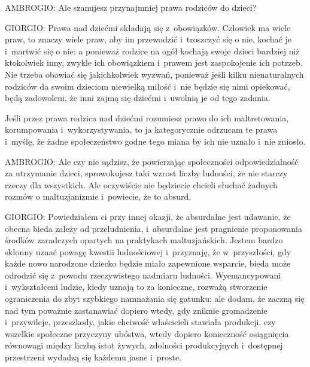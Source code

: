 \documentclass[oneside,polish,11pt,sfheadings]{mwbk}
\begin{document}
 
\noindent AMBROGIO: Ale szanujesz przynajmniej prawa rodziców do dzieci? 




 
\noindent GIORGIO: Prawa nad dziećmi składają się z~obowiązków. Człowiek ma wiele praw, to znaczy wiele praw, aby im przewodzić i~troszczyć się o nie, kochać je i~martwić się o nie: a ponieważ rodzice na ogół kochają swoje dzieci bardziej niż
ktokolwiek inny, zwykle ich obowiązkiem i~prawem jest zaspokojenie ich potrzeb. Nie trzeba obawiać się jakichkolwiek
wyzwań, ponieważ jeśli kilku nienaturalnych rodziców da swoim dzieciom niewielką miłość i~nie będzie się nimi
opiekować, będą zadowoleni, że inni zajmą się dziećmi i~uwolnią je od tego zadania. 

 
Jeśli przez prawa rodzica nad dziećmi rozumiesz prawo do ich maltretowania, korumpowania i~wykorzystywania, to ja
kategorycznie odrzucam te prawa i~myślę, że żadne społeczeństwo godne tego miana by ich nie uznało i~nie zniosło. 




 
\noindent AMBROGIO: Ale czy nie sądzisz, że powierzając społeczności odpowiedzialność za utrzymanie dzieci, sprowokujesz taki
wzrost liczby ludności, że nie starczy rzeczy dla wszystkich. Ale oczywiście nie będziecie chcieli słuchać żadnych
rozmów o maltuzjanizmie i~powiecie, że to absurd. 




 
\noindent GIORGIO: Powiedziałem ci przy innej okazji, że absurdalne jest udawanie, że obecna bieda zależy od przeludnienia, i~absurdalne jest pragnienie proponowania środków zaradczych opartych na praktykach maltuzjańskich. Jestem bardzo skłonny
uznać powagę kwestii ludnościowej i~przyznaję, że w~przyszłości, gdy każde nowo narodzone dziecko będzie miało
zapewnione wsparcie, bieda może odrodzić się z~powodu rzeczywistego nadmiaru ludności. Wyemancypowani i~wykształceni
ludzie, kiedy uznają to za konieczne, rozważą stworzenie ograniczenia do zbyt szybkiego namnażania się gatunku; ale
dodam, że zaczną się nad tym poważnie zastanawiać dopiero wtedy, gdy zniknie gromadzenie i~przywileje, przeszkody,
jakie chciwość właścicieli stawiała produkcji, czy wszelkie społeczne przyczyny ubóstwa, wtedy dopiero konieczność
osiągnięcia równowagi między liczbą istot żywych, zdolności produkcyjnych i~dostępnej przestrzeni wydadzą się każdemu
jasne i~proste. 
\end{document}
